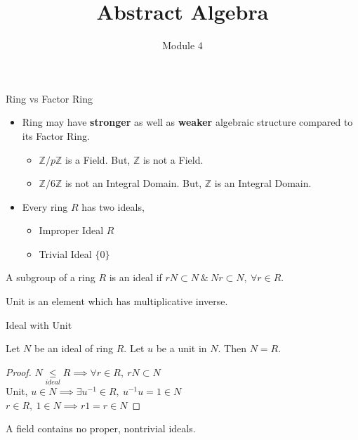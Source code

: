 \documentclass{beamer}
\title{Abstract Algebra}
\author{Module 4}
\institute{Section 27 : Prime and Maximal Ideals}
\newcommand{\subgroup}{\le}
\begin{document}
\begin{frame}
	\maketitle
\end{frame}

\begin{frame}{Ring vs Factor Ring}
\begin{itemize}
	\item Ring may have \textbf{stronger} as well as \textbf{weaker} algebraic structure compared to its Factor Ring.
	\begin{itemize}
		\item $\mathbb{Z}/p\mathbb{Z}$ is a Field. But, $\mathbb{Z}$ is not a Field.
		\item $\mathbb{Z}/6\mathbb{Z}$ is not an Integral Domain. But, $\mathbb{Z}$ is an Integral Domain.
	\end{itemize}
	\item Every ring $R$ has two ideals,
	\begin{itemize}
		\item Improper Ideal $R$
		\item Trivial Ideal $\{0\}$
	\end{itemize}
\end{itemize}

\begin{definition}[Ideal]
	A subgroup of a ring $R$ is an ideal if $rN \subset N\ \&\ Nr \subset N,\ \forall r \in R$.
\end{definition}

\begin{definition}[Unit]
	Unit is an element which has multiplicative inverse.
\end{definition}

\end{frame}

\begin{frame}{Ideal with Unit}
\begin{theorem}
	Let $N$ be an ideal of ring $R$. Let $u$ be a unit in $N$.
	Then $N = R$.
\end{theorem}
\begin{proof}
	$N \underset{ideal}{\subgroup} R \implies \forall r \in R,\ rN \subset N$\\
	Unit, $u \in N \implies \exists u^{-1} \in R,\ u^{-1}u = 1 \in N$\\
	$r \in R,\ 1 \in N \implies r1 = r \in N$
\end{proof}
\begin{corollary}
	A field contains no proper, nontrivial ideals.
\end{corollary}
\end{frame}
\end{document}
